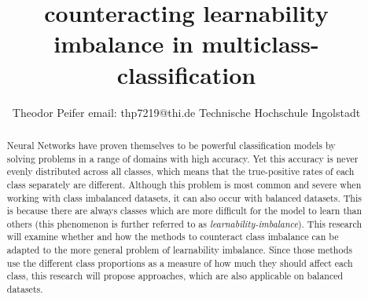 \documentclass[journal]{IEEEtran}
\begin{document}
 
\title{\textbf{counteracting learnability imbalance in multiclass-classification}}

\author{Theodor Peifer
        \linebreak
        email: thp7219@thi.de
        \linebreak
        Technische Hochschule Ingolstadt
}

\maketitle

\begin{abstract}
Neural Networks have proven themselves to be powerful classification
models by solving problems in a range of domains with high accuracy.
Yet this accuracy is never evenly distributed across all classes, which means that the true-positive rates of each class separately are different.
Although this problem is most common and severe when working with class imbalanced datasets, it can also occur with balanced datasets.
This is because there are always classes which are more difficult for the model to learn than others (this phenomenon is further referred to as \emph{learnability-imbalance}).
This research will examine whether and how the methods to counteract class imbalance can be adapted to the more general problem of learnability imbalance.
Since those methods use the different class proportions as a measure of how much they should affect each class, this research will propose approaches, which are also applicable on balanced datasets.

\end{abstract}
\end{document}
